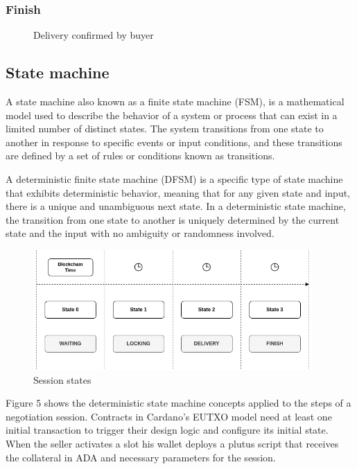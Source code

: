 \documentclass[12pt]{article}
\begin{document}
\subsubsection { Finish }

\begin{figure}[ht]
  \centering
  
  \caption{Delivery confirmed by buyer}
  \label{fig:delivered}
\end{figure}




\subsection { State machine }

A state machine also known as a finite state machine (FSM), is a mathematical model used to describe the behavior of a system or process that can exist in a limited number of distinct states. The system transitions from one state to another in response to specific events or input conditions, and these transitions are defined by a set of rules or conditions known as transitions.

A deterministic finite state machine (DFSM) is a specific type of state machine that exhibits deterministic behavior, meaning that for any given state and input, there is a unique and unambiguous next state. In a deterministic state machine, the transition from one state to another is uniquely determined by the current state and the input with no ambiguity or randomness involved.

\begin{figure}[ht]
  \centering
  \includegraphics[width=0.95\textwidth]{machine.png}
  \caption{Session states}
  \label{fig:States}
\end{figure}

Figure 5 shows the deterministic state machine concepts applied to the steps of a negotiation session. Contracts in Cardano's EUTXO model need at least one initial transaction to trigger their design logic and configure its initial state. When the seller activates a slot his wallet deploys a plutus script that receives the collateral in ADA and necessary parameters for the session. 
\\
\end{document}
